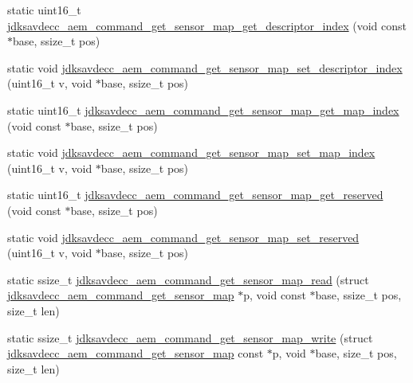 \begin{DoxyCompactItemize}
\item 
static uint16\+\_\+t \hyperlink{group__command__get__sensor__map_ga821f742709adbd3ddb08231d90c0ca7c}{jdksavdecc\+\_\+aem\+\_\+command\+\_\+get\+\_\+sensor\+\_\+map\+\_\+get\+\_\+descriptor\+\_\+index} (void const $\ast$base, ssize\+\_\+t pos)
\item 
static void \hyperlink{group__command__get__sensor__map_ga2bd5d1194ebcfac8aa5b2db99f570831}{jdksavdecc\+\_\+aem\+\_\+command\+\_\+get\+\_\+sensor\+\_\+map\+\_\+set\+\_\+descriptor\+\_\+index} (uint16\+\_\+t v, void $\ast$base, ssize\+\_\+t pos)
\item 
static uint16\+\_\+t \hyperlink{group__command__get__sensor__map_gab0e15317e59a3139bad2a6b5183afe07}{jdksavdecc\+\_\+aem\+\_\+command\+\_\+get\+\_\+sensor\+\_\+map\+\_\+get\+\_\+map\+\_\+index} (void const $\ast$base, ssize\+\_\+t pos)
\item 
static void \hyperlink{group__command__get__sensor__map_ga81f205f05878f0480ee6a1bfbf71ee57}{jdksavdecc\+\_\+aem\+\_\+command\+\_\+get\+\_\+sensor\+\_\+map\+\_\+set\+\_\+map\+\_\+index} (uint16\+\_\+t v, void $\ast$base, ssize\+\_\+t pos)
\item 
static uint16\+\_\+t \hyperlink{group__command__get__sensor__map_gaec34bdceb4726819d8d933150c2f7823}{jdksavdecc\+\_\+aem\+\_\+command\+\_\+get\+\_\+sensor\+\_\+map\+\_\+get\+\_\+reserved} (void const $\ast$base, ssize\+\_\+t pos)
\item 
static void \hyperlink{group__command__get__sensor__map_gad33b117da4aa905f4d5db29ba3a08947}{jdksavdecc\+\_\+aem\+\_\+command\+\_\+get\+\_\+sensor\+\_\+map\+\_\+set\+\_\+reserved} (uint16\+\_\+t v, void $\ast$base, ssize\+\_\+t pos)
\item 
static ssize\+\_\+t \hyperlink{group__command__get__sensor__map_gace182f8a6c580e5533375369be3a34c3}{jdksavdecc\+\_\+aem\+\_\+command\+\_\+get\+\_\+sensor\+\_\+map\+\_\+read} (struct \hyperlink{structjdksavdecc__aem__command__get__sensor__map}{jdksavdecc\+\_\+aem\+\_\+command\+\_\+get\+\_\+sensor\+\_\+map} $\ast$p, void const $\ast$base, ssize\+\_\+t pos, size\+\_\+t len)
\item 
static ssize\+\_\+t \hyperlink{group__command__get__sensor__map_gaccd6a7cb5df8962f81d3058f6b9f9734}{jdksavdecc\+\_\+aem\+\_\+command\+\_\+get\+\_\+sensor\+\_\+map\+\_\+write} (struct \hyperlink{structjdksavdecc__aem__command__get__sensor__map}{jdksavdecc\+\_\+aem\+\_\+command\+\_\+get\+\_\+sensor\+\_\+map} const $\ast$p, void $\ast$base, size\+\_\+t pos, size\+\_\+t len)
\end{DoxyCompactItemize}


